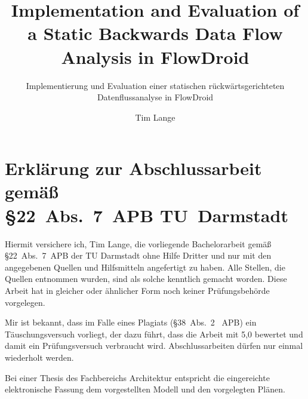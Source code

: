 \documentclass[
	english,
	ruledheaders=section,%
	class=report,%
	thesis={type=bachelor},%
	accentcolor=9c,%
	custommargins=true,%
	marginpar=false,%
	parskip=half-,%
	fontsize=11pt,%
	IMRAD=false
]{tudapub}
\title{Implementation and Evaluation of a Static Backwards Data Flow Analysis in FlowDroid}
\subtitle{Implementierung und Evaluation einer statischen rückwärtsgerichteten Datenflussanalyse in FlowDroid}
\author[T. Lange]{Tim Lange}%
\institute{Fraunhofer SIT}
\begin{document}
\maketitle

\tableofcontents
\newpage

\section*{Erklärung zur Abschlussarbeit gemäß\\ \S{}22~Abs.~7~APB TU~Darmstadt}
\begin{sloppypar}%
Hiermit versichere ich, Tim Lange, die vorliegende Bachelorarbeit gemäß \S{}22~Abs.~7~APB der TU Darmstadt ohne Hilfe Dritter und nur mit den angegebenen Quellen und Hilfsmitteln angefertigt zu haben.
Alle Stellen, die Quellen entnommen wurden, sind als solche kenntlich gemacht worden. Diese Arbeit hat in gleicher oder ähnlicher Form noch keiner Prüfungsbehörde vorgelegen.
\end{sloppypar}%
\par
Mir ist bekannt, dass im Falle eines Plagiats (\S{}38~Abs.~2 ~APB) ein Täuschungsversuch vorliegt, der dazu führt, dass die Arbeit mit 5,0 bewertet und damit ein Prüfungsversuch verbraucht wird. Abschlussarbeiten dürfen nur einmal wiederholt werden.
\par
Bei einer Thesis des Fachbereichs Architektur entspricht die eingereichte elektronische Fassung dem vorgestellten Modell und den vorgelegten Plänen.
\AffidavitSignature










\printbibliography
\end{document}
